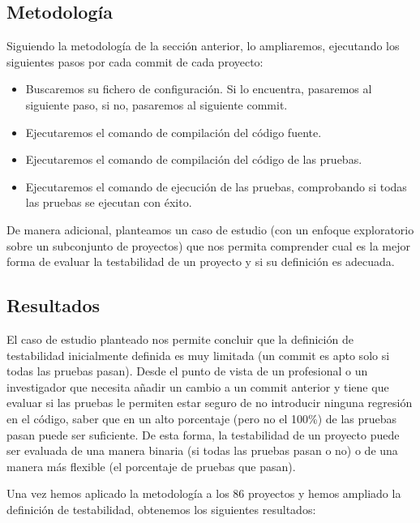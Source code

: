 \subsection{Metodología}

Siguiendo la metodología de la sección anterior, lo ampliaremos, ejecutando los siguientes pasos por cada commit de cada proyecto:

\begin{itemize}
    \item Buscaremos su fichero de configuración. Si lo encuentra, pasaremos al siguiente paso, si no, pasaremos al siguiente commit.
    \item Ejecutaremos el comando de compilación del código fuente.
    \item Ejecutaremos el comando de compilación del código de las pruebas.
    \item Ejecutaremos el comando de ejecución de las pruebas, comprobando si todas las pruebas se ejecutan con éxito.
\end{itemize}

De manera adicional, planteamos un caso de estudio (con un enfoque exploratorio sobre un subconjunto de proyectos) que nos permita comprender cual es la mejor forma de evaluar la testabilidad de un proyecto y si su definición es adecuada.

\subsection{Resultados}

El caso de estudio planteado nos permite concluir que la definición de testabilidad inicialmente definida es muy limitada (un commit es apto solo si todas las pruebas pasan). 
Desde el punto de vista de un profesional o un investigador que necesita añadir un cambio a un commit anterior y tiene que evaluar si las pruebas le permiten estar seguro de no introducir ninguna regresión en el código, saber que en un alto porcentaje (pero no el 100\%) de las pruebas pasan puede ser suficiente.
De esta forma, la testabilidad de un proyecto puede ser evaluada de una manera binaria (si todas las pruebas pasan o no) o de una manera más flexible (el porcentaje de pruebas que pasan).

Una vez hemos aplicado la metodología a los 86 proyectos y hemos ampliado la definición de testabilidad, obtenemos los siguientes resultados:

